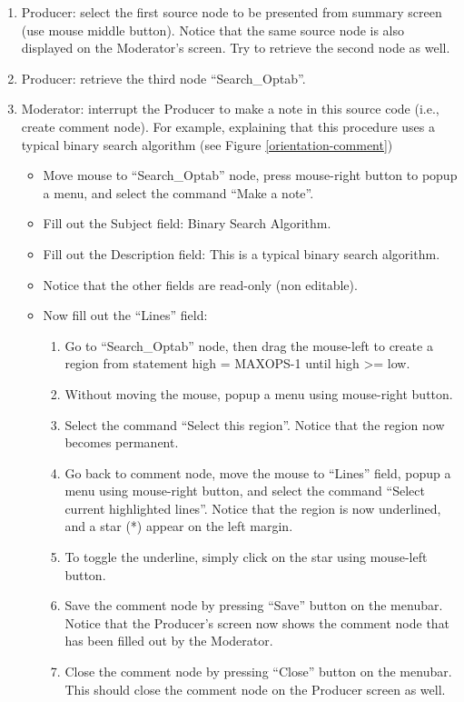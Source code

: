 \begin{enumerate}
 \item Producer: select the first source node to be presented from summary
 screen (use mouse middle button). 
Notice that the same source node is also displayed on the Moderator's 
screen. Try to retrieve the second node as well.
 \item Producer: retrieve the third node ``Search\_Optab''.
 \item Moderator: interrupt the Producer to make a note in this source
 code (i.e., create comment node). For example, explaining that this
 procedure uses a typical  binary search  algorithm (see Figure \ref{orientation-comment})

  \begin{itemize}
   \item Move mouse to ``Search\_Optab'' node, press mouse-right button
   to popup a menu, and select the command ``Make a note''.
   \item Fill out the Subject field: Binary Search Algorithm.
   \item Fill out the Description field: This is a typical binary
   search algorithm.
   \item Notice that the other fields are read-only (non editable).
   \item Now fill out the ``Lines'' field:
     \begin{enumerate}
       \item Go to ``Search\_Optab'' node, then
         drag the mouse-left to create a region from statement high =
         MAXOPS-1 until high >= low.
       \item Without moving the mouse, popup a menu using mouse-right
       button. 
       \item Select the command ``Select this region''. Notice that
       the region now becomes permanent.
       \item Go back to comment node, move the mouse to ``Lines''
       field, popup a menu using mouse-right button, and select the
       command ``Select current highlighted lines''.
       Notice that the region is now underlined, and a star (*) appear
       on the left margin. 
       \item To toggle the underline, simply click on the 
       star using mouse-left button.
       \item Save the comment node by pressing ``Save'' button on the
       menubar. Notice that the Producer's screen now shows the
       comment node that has been filled out by the Moderator.
       \item Close the comment node by pressing ``Close'' button on
       the menubar. This should close the comment node on the
       Producer screen as well.
     \end{enumerate}
  \end{itemize}


\end{enumerate}
